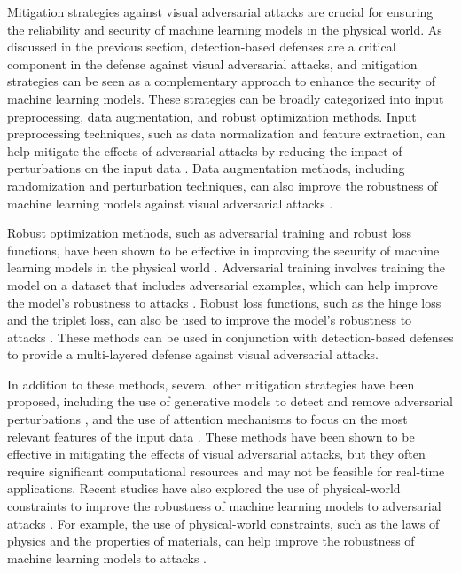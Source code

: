\documentclass[11pt,a4paper]{article}
\begin{document}
Mitigation strategies against visual adversarial attacks are crucial for ensuring the reliability and security of machine learning models in the physical world. As discussed in the previous section, detection-based defenses are a critical component in the defense against visual adversarial attacks, and mitigation strategies can be seen as a complementary approach to enhance the security of machine learning models. These strategies can be broadly categorized into input preprocessing, data augmentation, and robust optimization methods. Input preprocessing techniques, such as data normalization and feature extraction, can help mitigate the effects of adversarial attacks by reducing the impact of perturbations on the input data \cite{arxiv:1712.09665}. Data augmentation methods, including randomization and perturbation techniques, can also improve the robustness of machine learning models against visual adversarial attacks \cite{doi:10.24963/ijcai.2021/694}.

Robust optimization methods, such as adversarial training and robust loss functions, have been shown to be effective in improving the security of machine learning models in the physical world \cite{arxiv:1707.08945}. Adversarial training involves training the model on a dataset that includes adversarial examples, which can help improve the model's robustness to attacks \cite{doi:10.1016/j.eng.2019.12.012}. Robust loss functions, such as the hinge loss and the triplet loss, can also be used to improve the model's robustness to attacks \cite{arxiv:1902.06705}. These methods can be used in conjunction with detection-based defenses to provide a multi-layered defense against visual adversarial attacks.

In addition to these methods, several other mitigation strategies have been proposed, including the use of generative models to detect and remove adversarial perturbations \cite{doi:10.1109/cvpr46437.2021.01167}, and the use of attention mechanisms to focus on the most relevant features of the input data \cite{doi:10.1109/cvpr52688.2022.01480}. These methods have been shown to be effective in mitigating the effects of visual adversarial attacks, but they often require significant computational resources and may not be feasible for real-time applications. Recent studies have also explored the use of physical-world constraints to improve the robustness of machine learning models to adversarial attacks \cite{doi:10.1109/access.2023.3321118}. For example, the use of physical-world constraints, such as the laws of physics and the properties of materials, can help improve the robustness of machine learning models to attacks \cite{doi:10.1109/cvpr52729.2023.01187}.
\end{document}
